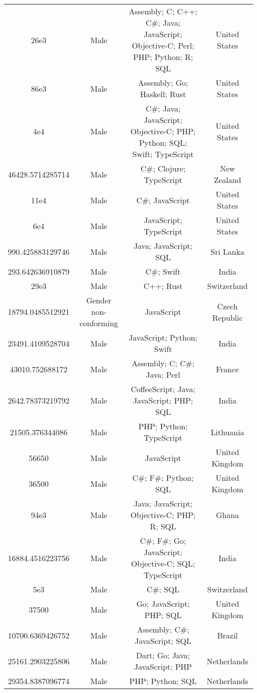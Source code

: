 \begin{center}
\begin{tabular}{ |c|c|c|c| }
26e3  &  Male  &  Assembly; C; C++; C\#; Java; JavaScript; Objective-C; Perl; PHP; Python; R; SQL  &  United States  \\ 
86e3  &  Male  &  Assembly; Go; Haskell; Rust  &  United States  \\ 
4e4  &  Male  &  C\#; Java; JavaScript; Objective-C; PHP; Python; SQL; Swift; TypeScript  &  United States  \\ 
46428.5714285714  &  Male  &  C\#; Clojure; TypeScript  &  New Zealand  \\ 
11e4  &  Male  &  C\#; JavaScript  &  United States  \\ 
6e4  &  Male  &  JavaScript; TypeScript  &  United States  \\ 
990.425883129746  &  Male  &  Java; JavaScript; SQL  &  Sri Lanka  \\ 
293.642636910879  &  Male  &  C\#; Swift  &  India  \\ 
29e3  &  Male  &  C++; Rust  &  Switzerland  \\ 
18794.0485512921  &  Gender non-conforming  &  JavaScript  &  Czech Republic  \\ 
23491.4109528704  &  Male  &  JavaScript; Python; Swift  &  India  \\ 
43010.752688172  &  Male  &  Assembly; C; C\#; Java; Perl  &  France  \\ 
2642.78373219792  &  Male  &  CoffeeScript; Java; JavaScript; PHP; SQL  &  India  \\ 
21505.376344086  &  Male  &  PHP; Python; TypeScript  &  Lithuania  \\ 
56650  &  Male  &  JavaScript  &  United Kingdom  \\ 
36500  &  Male  &  C\#; F\#; Python; SQL  &  United Kingdom  \\ 
94e3  &  Male  &  Java; JavaScript; Objective-C; PHP; R; SQL  &  Ghana  \\ 
16884.4516223756  &  Male  &  C\#; F\#; Go; JavaScript; Objective-C; SQL; TypeScript  &  India  \\ 
5e3  &  Male  &  C\#; SQL  &  Switzerland  \\ 
37500  &  Male  &  Go; JavaScript; PHP; SQL  &  United Kingdom  \\ 
10700.6369426752  &  Male  &  Assembly; C\#; JavaScript; SQL  &  Brazil  \\ 
25161.2903225806  &  Male  &  Dart; Go; Java; JavaScript; PHP  &  Netherlands  \\ 
29354.8387096774  &  Male  &  PHP; Python; SQL  &  Netherlands  \\ 

\end{tabular}
\end{center}
